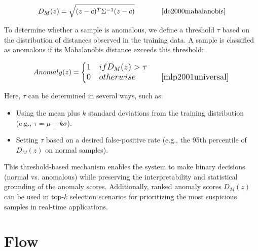 \begin{ZhChapter}
\begin{equation}
    D_M(z) = \sqrt{(z - c)^T \Sigma^{-1} (z - c)} \tag*{\makebox[3.8cm][r]{\cite{de2000mahalanobis}}}
\end{equation}

To determine whether a sample is anomalous, we define a threshold $\tau$ based on the distribution of distances observed in the training data. A sample is classified as anomalous if its Mahalanobis distance exceeds this threshold:

\begin{equation}
    \text{Anomaly}(z) =
    \begin{cases}
        1 & \text{if } D_M(z) > \tau                                            \\
        0 & \text{otherwise} \tag*{\makebox[3.8cm][r]{\cite{mlp2001universal}}}
    \end{cases}
\end{equation}

Here, $\tau$ can be determined in several ways, such as:
\begin{itemize}
    \item Using the mean plus $k$ standard deviations from the training distribution (e.g., $\tau = \mu + k\sigma$).
    \item Setting $\tau$ based on a desired false-positive rate (e.g., the 95th percentile of $D_M(z)$ on normal samples).
\end{itemize}

This threshold-based mechanism enables the system to make binary decisions (normal vs. anomalous) while preserving the interpretability and statistical grounding of the anomaly scores. Additionally, ranked anomaly scores $D_M(z)$ can be used in top-$k$ selection scenarios for prioritizing the most suspicious samples in real-time applications.







\section{Flow} %

\end{ZhChapter}
